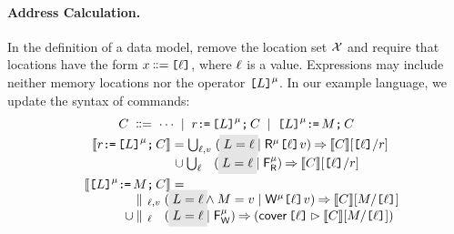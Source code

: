 \paragraph{Address Calculation.}
In the definition of a data model, remove the location set $\mathcal{X}$ and require
that locations have the form $x\!\!\;\mathrel{\mathord{\vcentcolon}\mkern-1mu\mathord{\vcentcolon}\mathord{{=}}}\;\!\!\texttt{[}\ell\texttt{]}$, where $\ell$
is a value.  Expressions may include neither memory locations nor the
operator $\texttt{[}L\texttt{]}^{\mu}$.
In our example language, we update the syntax of commands:
\begin{gather*}
  \aCmd
  \BNFDEF \cdots
  \BNFSEP \aReg\GETS\REF{\cExp}^{\amode}\SEMI \aCmd 
  \BNFSEP \REF{\cExp}^{\amode}\GETS\aExp\SEMI \aCmd
  \\
\begin{aligned}
  \sem{\aReg\GETS\REF{\cExp}^\amode\SEMI \aCmd} & =
  \textstyle\bigcup_{\cVal,\aVal}\; (\;\mathhl{\cExp=\cVal} \mid \DRmode{\REF{\cVal}}\aVal) \prefix \sem{\aCmd}[\REF{\cVal}/\aReg]  
  \\[-.5ex] & \mkern2mu\cup
  \textstyle\bigcup_{\cVal\phantom{,\aVal}}\; (\;\mathhl{\cExp=\cVal}\mid\DFR{\amode}) \prefix
  \sem{\aCmd}[\REF{\cVal}/\aReg]
  \\
  \sem{\REF{\cExp}^\amode\GETS\aExp\SEMI \aCmd} & =
  \\[-1ex]
  &\mkern-65mu\hbox to 0pt{$\begin{aligned}
    &\textstyle\PAR_{\cVal,\aVal}\;(\;\mathhl{\cExp=\cVal} \land \aExp=\aVal \mid \DWmode{\REF{\cVal}}\aVal) \prefix \sem{\aCmd}[\aExp/\REF{\cVal}]
    \\[-.5ex]  \cup\!&
    \textstyle\PAR_{\cVal\phantom{,\aVal}}\; (\;\mathhl{\cExp=\cVal}\mid\DFW{\amode}) \prefix
    (\relfilt{\REF{\cVal}} \sem{\aCmd}[\aExp/\REF{\cVal}])    
  \end{aligned}$}
\end{aligned}
\end{gather*}


